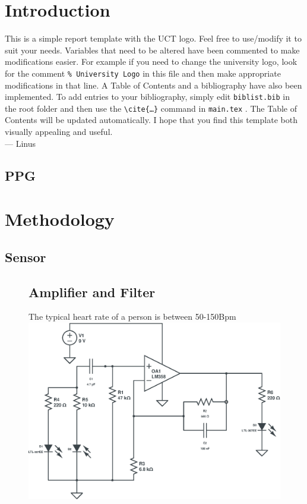 \documentclass[12pt]{article}
\begin{document}
\section{Introduction}
This is a simple report template with the UCT logo. Feel free to use/modify it to suit your needs. Variables that need to be altered have been commented to make modifications easier. For example if you need to change the university logo, look for the comment \texttt{\% University Logo} in this file and then make appropriate modifications in that line.
A Table of Contents and a bibliography have also been implemented. To add entries to your bibliography, simply edit \texttt{biblist.bib} in the root folder and then use the \texttt{\textbackslash cite\{\ldots\}} command in \texttt{main.tex} \cite{ppg_wiki}. The Table of Contents will be updated automatically.
I hope that you find this template both visually appealing and useful. \\
\hspace{1 cm}--- Linus
\subsection{PPG}



\newpage
\section{Methodology}
	\subsection{Sensor}
	\lipsum[45]

	
	\begin{figure}[h]
		\subsection{Amplifier and Filter}
		The typical heart rate of a person is between 50-150Bpm\\
	
		\centering
		\includegraphics[width=\textwidth]{LM358-Bandpass}
	\end{figure}
\end{document}
